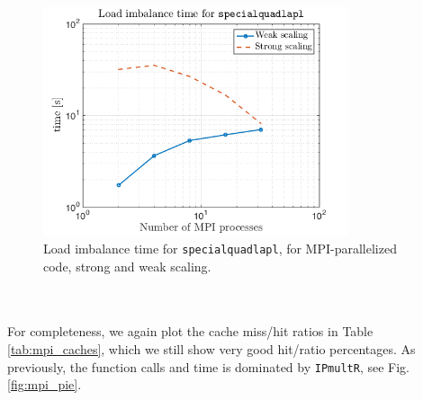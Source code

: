 \documentclass[a4paper,10pt]{article}
\def\code#1{\texttt{#1}}
\begin{document}
\begin{figure}[ht]
    \begin{center}
        \includegraphics[width=0.8\textwidth]{Graphics/mpi_loadimb.png}
    \end{center}
    \caption{Load imbalance time for \code{specialquadlapl}, for MPI-parallelized code, strong and weak scaling.}
    \label{fig:mpi_loadimb}
\end{figure}
\\ \\
For completeness, we again plot the cache miss/hit ratios in Table \ref{tab:mpi_caches}, which we still show very good hit/ratio percentages. As previously, the function calls and time is dominated by \code{IPmultR}, see Fig. \ref{fig:mpi_pie}.
\end{document}
